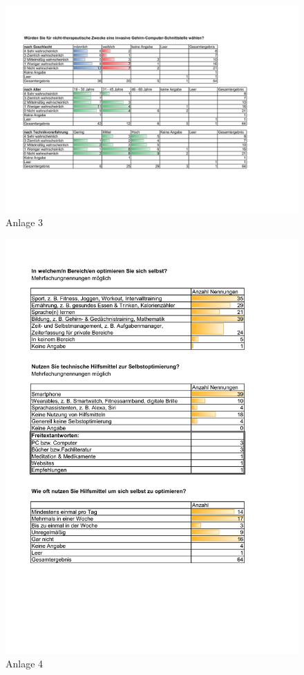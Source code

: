 \documentclass[11pt,ngerman,parskip=half]{scrartcl}
\begin{document}
\begin{appendices}
  \begin{figure}[H]
    \centering
    \includegraphics[width=\textwidth,height=\textheight,keepaspectratio]{src/img/kathrin-a3.png}
    \caption{Anlage 3}
  \end{figure}
  \pagebreak

  \begin{figure}[H]
    \centering
    \includegraphics[width=\textwidth,height=\textheight,keepaspectratio]{src/img/kathrin-a4.png}
    \caption{Anlage 4}
  \end{figure}
  \pagebreak


\end{appendices}
\end{document}
